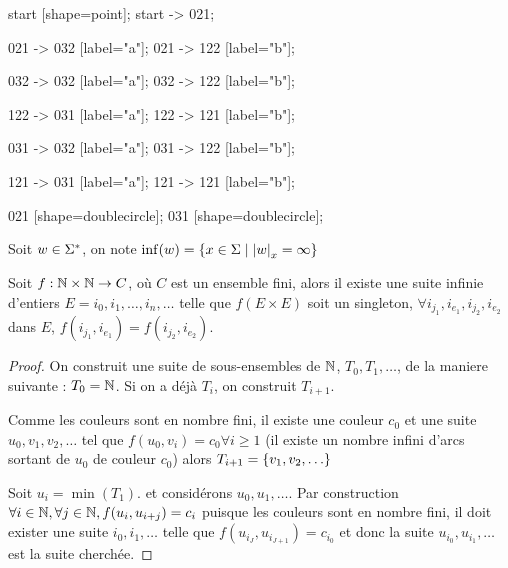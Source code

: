 \begin{exemple}
\begin{itemize}
\begin{automata}
{				      start [shape=point];
				      start -> 021;

				      021 -> 032 [label="a"];
				      021 -> 122 [label="b"];

				      032 -> 032 [label="a"];
				      032 -> 122 [label="b"];


				      122 -> 031 [label="a"];
				      122 -> 121 [label="b"];


				      031 -> 032 [label="a"];
				      031 -> 122 [label="b"];

				      121 -> 031 [label="a"];
				      121 -> 121 [label="b"];

				      021 [shape=doublecircle];
				      031 [shape=doublecircle];
			      }
		      \end{automata}
	\end{itemize}
\end{exemple}

\begin{notation}
	Soit $w \in \Sigma^{*}$, on note $\inf (w) = \left\{x \in \Sigma \mid {\left|w\right|}_x = \infty\right\}$
\end{notation}



\begin{theorem}
	Soit $f : \mathbb{N} \times \mathbb{N} \to C $, où $C$ est un ensemble fini, alors il existe une suite infinie d'entiers $E = i_0, i_1, \ldots, i_n, \ldots$
	telle que $f(E \times E)$ soit un singleton, \ie $\forall i_{j_1},i_{e_1},i_{j_2},i_{e_2}$ dans $E$, $f(i_{j_1},i_{e_1})=f(i_{j_2},i_{e_2})$.
\end{theorem}

\begin{proof}
	On construit une suite de sous-ensembles de $\mathbb{N}$, $T_0, T_1, \ldots$, de la maniere suivante :
	$T_0 = \mathbb{N}$. Si on a déjà $T_i$, on construit $T_{i+1}$.

	Comme les couleurs sont en nombre fini, il existe une couleur $c_0$ et une suite
	$u_0, v_1, v_2, \ldots$ tel que $f(u_0, v_i) = c_0 \forall i \geq 1$ (il existe un nombre infini d'arcs sortant de $u_0$ de couleur $c_0$)
	alors $T_{i+1} = \left\{v_1, v_2, \ldots\right\}$


	Soit $u_i = \min (T_1)$. et considérons $u_0, u_1, \ldots$. Par construction $\forall i \in \mathbb{N}, \forall j \in \mathbb{N}, f(u_i, u_{i + j}) = c_i$
	puisque les couleurs sont en nombre fini, il doit exister une suite $i_0, i_1, \ldots$ telle que $f(u_{i_J}, u_{i_{J+1}}) = c_{i_0}$
	et donc la suite $u_{i_0},u_{i_1}, \ldots$ est la suite cherchée.
\end{proof}


